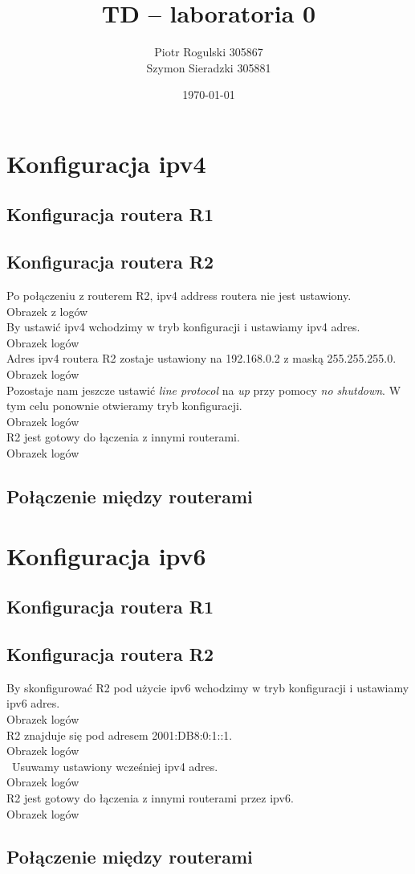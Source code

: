 \documentclass[a4paper,12pt,notitlepage]{article}
\title{\textbf{TD -- laboratoria 0}}
\author{Piotr Rogulski 305867 \\ Szymon Sieradzki 305881}
\date{\today}
\begin{document}
\maketitle
\section{Konfiguracja ipv4}
\subsection{Konfiguracja routera R1}
\subsection{Konfiguracja routera R2}
Po połączeniu z routerem R2, ipv4 address routera nie jest ustawiony.
\\ Obrazek z logów \\
By ustawić ipv4 wchodzimy w tryb konfiguracji i ustawiamy ipv4 adres.
\\Obrazek logów \\
Adres ipv4 routera R2 zostaje ustawiony na 192.168.0.2 z maską 255.255.255.0.
\\Obrazek logów\\
Pozostaje nam jeszcze ustawić \textit{line protocol} na \textit{up} przy pomocy \textit{no shutdown}. W tym celu ponownie otwieramy tryb konfiguracji.
\\Obrazek logów\\
R2 jest gotowy do łączenia z innymi routerami.
\\Obrazek logów\\
\subsection{Połączenie między routerami}
\section{Konfiguracja ipv6}
\subsection{Konfiguracja routera R1}
\subsection{Konfiguracja routera R2}
By skonfigurować R2 pod użycie ipv6 wchodzimy w tryb konfiguracji i ustawiamy ipv6 adres.
\\Obrazek logów \\
R2 znajduje się pod adresem 2001:DB8:0:1::1.
\\Obrazek logów\\\
Usuwamy ustawiony wcześniej ipv4 adres.
\\Obrazek logów\\
R2 jest gotowy do łączenia z innymi routerami przez ipv6.
\\Obrazek logów\\
\subsection{Połączenie między routerami}
\end{document}
